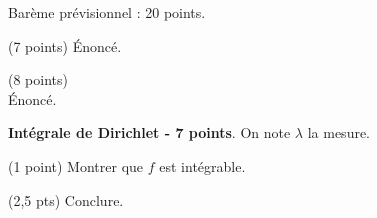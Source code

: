 \documentclass[11pt]{ocots-exam}
\begin{document}
\begin{instructions}
    \item Barème prévisionnel : 20 points. %
\end{instructions}
\begin{exercise}(7 points) %
    Énoncé.
\end{exercise}
\begin{exercise}\mbox{}(8 points)\\ %
    Énoncé.
\end{exercise}
\begin{exercise}[label=ex:dirichlet]
    \textbf{Intégrale de Dirichlet - 7 points}. On note $\lambda$ la mesure. %
    \begin{question}
        (1 point) Montrer que $f$ est intégrable. %
    \end{question}
    \begin{question}
        (2,5 pts) Conclure. %
    \end{question}
\end{exercise}
\end{document}
